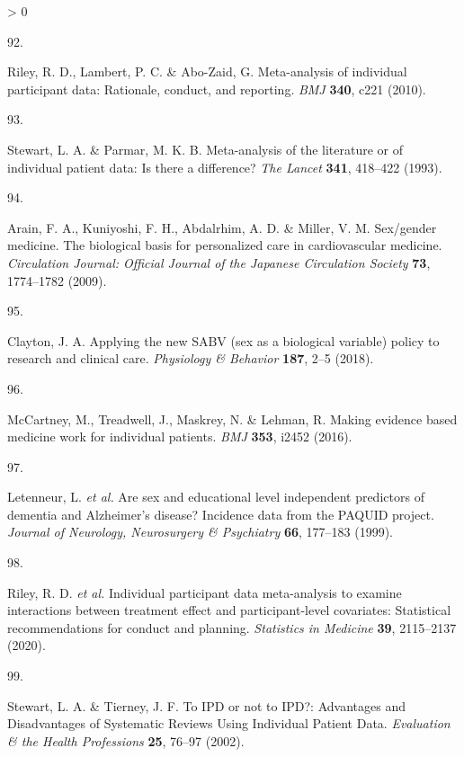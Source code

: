 \documentclass[a4paper, twoside]{templates/ociamthesis}
\newlength{\cslhangindent}
\newlength{\csllabelwidth}
\newenvironment{CSLReferences}[3] %
 {%
  \setlength{\parindent}{0pt}
  \ifodd #1 \everypar{\setlength{\hangindent}{\cslhangindent}}\ignorespaces\fi
  \ifnum #2 > 0
  \setlength{\parskip}{#2\baselineskip}
  \fi
 }%
 {}
\newcommand{\CSLLeftMargin}[1]{\parbox[t]{\maxof{\widthof{#1}}{\csllabelwidth}}{#1}}
\newcommand{\CSLRightInline}[1]{\parbox[t]{\linewidth - \csllabelwidth}{#1}}
\begin{document}
\begin{CSLReferences}{0}{0}
\leavevmode\hypertarget{ref-riley2010}{}%
\CSLLeftMargin{92. }
\CSLRightInline{Riley, R. D., Lambert, P. C. \& Abo-Zaid, G. Meta-analysis of individual participant data: Rationale, conduct, and reporting. \emph{BMJ} \textbf{340}, c221 (2010).}

\leavevmode\hypertarget{ref-stewart1993}{}%
\CSLLeftMargin{93. }
\CSLRightInline{Stewart, L. A. \& Parmar, M. K. B. Meta-analysis of the literature or of individual patient data: Is there a difference? \emph{The Lancet} \textbf{341}, 418--422 (1993).}

\leavevmode\hypertarget{ref-arain2009}{}%
\CSLLeftMargin{94. }
\CSLRightInline{Arain, F. A., Kuniyoshi, F. H., Abdalrhim, A. D. \& Miller, V. M. Sex/gender medicine. {The} biological basis for personalized care in cardiovascular medicine. \emph{Circulation Journal: Official Journal of the Japanese Circulation Society} \textbf{73}, 1774--1782 (2009).}

\leavevmode\hypertarget{ref-clayton2018}{}%
\CSLLeftMargin{95. }
\CSLRightInline{Clayton, J. A. Applying the new {SABV} (sex as a biological variable) policy to research and clinical care. \emph{Physiology \& Behavior} \textbf{187}, 2--5 (2018).}

\leavevmode\hypertarget{ref-mccartney2016}{}%
\CSLLeftMargin{96. }
\CSLRightInline{McCartney, M., Treadwell, J., Maskrey, N. \& Lehman, R. Making evidence based medicine work for individual patients. \emph{BMJ} \textbf{353}, i2452 (2016).}

\leavevmode\hypertarget{ref-letenneur1999}{}%
\CSLLeftMargin{97. }
\CSLRightInline{Letenneur, L. \emph{et al.} Are sex and educational level independent predictors of dementia and {Alzheimer}'s disease? Incidence data from the {PAQUID} project. \emph{Journal of Neurology, Neurosurgery \& Psychiatry} \textbf{66}, 177--183 (1999).}

\leavevmode\hypertarget{ref-riley2020}{}%
\CSLLeftMargin{98. }
\CSLRightInline{Riley, R. D. \emph{et al.} Individual participant data meta-analysis to examine interactions between treatment effect and participant-level covariates: Statistical recommendations for conduct and planning. \emph{Statistics in Medicine} \textbf{39}, 2115--2137 (2020).}

\leavevmode\hypertarget{ref-stewart2002}{}%
\CSLLeftMargin{99. }
\CSLRightInline{Stewart, L. A. \& Tierney, J. F. To {IPD} or not to {IPD}?: Advantages and {Disadvantages} of {Systematic Reviews Using Individual Patient Data}. \emph{Evaluation \& the Health Professions} \textbf{25}, 76--97 (2002).}


\end{CSLReferences}
\end{document}
